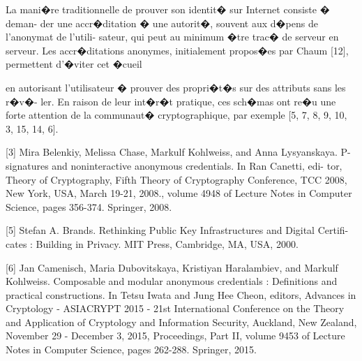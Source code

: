 \iffalse
\begin{verbatim}
    _.~"(_.~"(_.~"(_.~"(_.~"(

    Notes:
* reprendre le brouillon de Thomas et compléter

* intro generique d'AC + ajouter references AC non 
post-quantiques

* related work ? Cf commentaires ci-dessous

* directement AC (pas insister sur sig groupe), et implem

* CC: est-ce qu'il y a un avantage à utiliser 2018/779
+2020/517 plutôt que Vadim 2022/284 ? En termes d'implém ?

Éric: dans l'équation p3 on a un H(attribut) 
ils ne l'ont pas
eux ont un u fixé
nous c'est mieux car sinon on doit faire plusieurs 
signatures de groupe pour un AC 
-> nous, on peut mettre en une fois id et attr

on fait 2 signatures : sign(id | attr) et sign(id) 
et preuve même id

c'est une optimisation

Mais on pourrait le faire avec leur schéma, donc pas 
un avantage en fait... 
\end{verbatim}
\fi

\iffalse
La mani�re traditionnelle de prouver son identit� sur Internet consiste � 
deman- der une accr�ditation � une autorit�, souvent aux d�pens de l'anonymat 
de l'utili- sateur, qui peut au minimum �tre trac� de serveur en serveur. Les 
accr�ditations anonymes, initialement propos�es par Chaum [12], permettent 
d'�viter cet �cueil

en autorisant l'utilisateur � prouver des propri�t�s sur des attributs sans 
les r�v�- ler. En raison de leur int�r�t pratique, ces sch�mas ont re�u une 
forte attention de la communaut� cryptographique, par exemple [5, 7, 8, 9, 10, 
3, 15, 14, 6].

[3] Mira Belenkiy, Melissa Chase, Markulf Kohlweiss, and Anna Lysyanskaya.
P-signatures and noninteractive anonymous credentials. In Ran Canetti, edi-
tor, Theory of Cryptography, Fifth Theory of Cryptography Conference, TCC
2008, New York, USA, March 19-21, 2008., volume 4948 of Lecture Notes in
Computer Science, pages 356-374. Springer, 2008.

[5] Stefan A. Brands. Rethinking Public Key Infrastructures and Digital Certifi-
cates : Building in Privacy. MIT Press, Cambridge, MA, USA, 2000.

[6] Jan Camenisch, Maria Dubovitskaya, Kristiyan Haralambiev, and Markulf
Kohlweiss. Composable and modular anonymous credentials : Definitions
and practical constructions. In Tetsu Iwata and Jung Hee Cheon, editors,
Advances in Cryptology - ASIACRYPT 2015 - 21st International Conference on
the Theory and Application of Cryptology and Information Security, Auckland,
New Zealand, November 29 - December 3, 2015, Proceedings, Part II, volume
9453 of Lecture Notes in Computer Science, pages 262-288. Springer, 2015.

